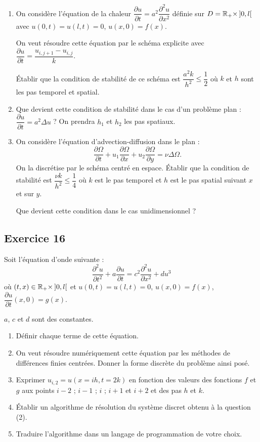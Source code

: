 \begin{enumerate}[label=\arabic*)]
  \item On considère l'équation de la chaleur
        $\dfrac{\partial u}{\partial t} = a^2\dfrac{\partial^2 u}{\partial x^2}$
        définie sur $D = \mathbb{R}_+ \times\, ]0, l[$ avec
        $u(0,t) = u(l,t) = 0$, $u(x,0) = f(x)$.

        On veut résoudre cette équation par le schéma explicite avec
        $\dfrac{\partial u}{\partial t} = \dfrac{u_{i,j+1} - u_{i,j}}{k}$.

        Établir que la condition de stabilité de ce schéma est
        $\dfrac{a^2k}{h^2} \le \dfrac{1}{2}$ où $k$ et $h$ sont les pas
        temporel et spatial.
  \item Que devient cette condition de stabilité dans le cas d'un problème
        plan : $\dfrac{\partial u}{\partial t} = a^2\Delta u$ ? On prendra
        $h_1$ et $h_2$ les pas spatiaux.
  \item On considère l'équation d'advection-diffusion dans le plan :
        \[
          \frac{\partial\Omega}{\partial t} + u_1\frac{\partial\Omega}{\partial x}
          + u_2\frac{\partial\Omega}{\partial y} = \nu\Delta\Omega .
        \]
        On la discrétise par le schéma centré en espace. Établir que la
        condition de stabilité est $\dfrac{\nu k}{h^2} \le \dfrac{1}{4}$ où
        $k$ est le pas temporel et $h$ est le pas spatial suivant $x$ et sur
        $y$.

        Que devient cette condition dans le cas unidimensionnel ?
\end{enumerate}

\subsection*{Exercice 16}

Soit l'équation d'onde suivante :
\[
  \frac{\partial^2 u}{\partial t^2} + a\frac{\partial u}{\partial t}
  = c^2\frac{\partial^2 u}{\partial x^2} + du^3
\]
où $(t, x) \in \mathbb{R}_+ \times\, ]0, l[$ et $u(0,t) = u(l,t) = 0$,
$u(x,0) = f(x)$, $\dfrac{\partial u}{\partial t}(x,0) = g(x)$.

$a$, $c$ et $d$ sont des constantes.
\begin{enumerate}[label=\arabic*)-]
  \item Définir chaque terme de cette équation.
  \item On veut résoudre numériquement cette équation par les méthodes de
        différences finies centrées. Donner la forme discrète du problème
        ainsi posé.
  \item Exprimer $u_{i,2} = u(x = ih, t = 2k)$ en fonction des valeurs des
        fonctions $f$ et $g$ aux points $i-2$ ; $i-1$ ; $i$ ; $i+1$ et $i+2$
        et des pas $h$ et $k$.
  \item Établir un algorithme de résolution du système discret obtenu à la
        question (2).
  \item Traduire l'algorithme dans un langage de programmation de votre choix.
\end{enumerate}

